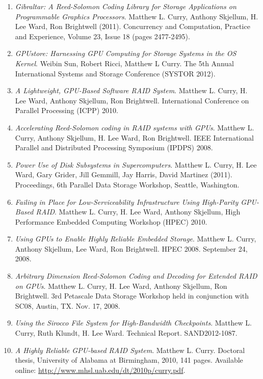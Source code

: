 \documentclass[11pt]{article}
\begin{document}
\begin{enumerate}
\item {\sl Gibraltar: A Reed-Solomon Coding Library for Storage Applications
  on Programmable Graphics Processors}.  Matthew L. Curry, Anthony
Skjellum, H. Lee Ward, Ron Brightwell (2011). Concurrency and
Computation, Practice and Experience, Volume 23, Issue 18 (pages
2477-2495).
\item {\sl GPUstore: Harnessing GPU Computing for Storage Systems in
  the OS Kernel}. Weibin Sun, Robert Ricci, Matthew L Curry. The 5th
  Annual International Systems and Storage Conference (SYSTOR 2012).
\item {\sl A Lightweight, GPU-Based Software RAID System}. Matthew
  L. Curry, H. Lee Ward, Anthony Skjellum, Ron
  Brightwell. International Conference on Parallel Processing (ICPP)
  2010.
\item {\sl Accelerating Reed-Solomon coding in RAID systems with
  GPUs}. Matthew L. Curry, Anthony Skjellum, H. Lee Ward, Ron
  Brightwell. IEEE International Parallel and Distributed Processing
  Symposium (IPDPS) 2008.
\item {\sl Power Use of Disk Subsystems in Supercomputers}.  Matthew
  L. Curry, H. Lee Ward, Gary Grider, Jill Gemmill, Jay Harris, David
  Martinez (2011). Proceedings, 6th Parallel Data Storage Workshop,
  Seattle, Washington.
\item {\sl Failing in Place for Low-Serviceability Infrastructure
  Using High-Parity GPU-Based RAID}. Matthew L. Curry, H. Lee Ward,
  Anthony Skjellum, High Performance Embedded Computing Workshop
  (HPEC) 2010.
\item {\sl Using GPUs to Enable Highly Reliable Embedded Storage}.
  Matthew L. Curry, Anthony Skjellum, Lee Ward, Ron Brightwell. HPEC
  2008. September 24, 2008.
\item {\sl Arbitrary Dimension Reed-Solomon Coding and Decoding for
  Extended RAID on GPUs}.  Matthew L. Curry, H. Lee Ward, Anthony
  Skjellum, Ron Brightwell. 3rd Petascale Data Storage Workshop held
  in conjunction with SC08, Austin, TX. Nov. 17, 2008.
\item {\sl Using the Sirocco File System for High-Bandwidth
  Checkpoints}. Matthew L. Curry, Ruth Klundt, H. Lee Ward. Technical
  Report. SAND2012-1087.
\item {\sl A Highly Reliable GPU-based RAID System}. Matthew
  L. Curry. Doctoral thesis, University of Alabama at Birmingham,
  2010, 141 pages. Available online:
  \url{http://www.mhsl.uab.edu/dt/2010p/curry.pdf}.
\end{enumerate}
\end{document}
